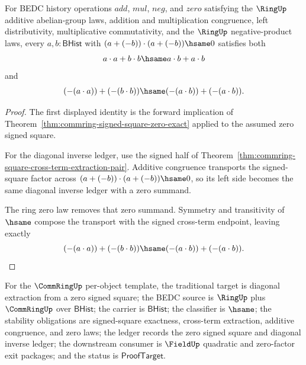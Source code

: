 \begin{theorem}
\label{thm:commring-signed-square-zero-diagonal-extraction-package}
For BEDC history operations $add$, $mul$, $neg$, and $zero$ satisfying the
$\RingUp$ additive abelian-group laws, addition and multiplication
congruence, left distributivity, multiplicative commutativity, and the
$\RingUp$ negative-product laws, every $a,b : \mathsf{BHist}$ with
$(a+(-b))\cdot(a+(-b))\hsame0$ satisfies both
$$
a\cdot a+b\cdot b\hsame a\cdot b+a\cdot b
$$
and
$$
(-(a\cdot a))+(-(b\cdot b))\hsame (-(a\cdot b))+(-(a\cdot b)).
$$
\end{theorem}
\begin{proof}
The first displayed identity is the forward implication of
Theorem~\ref{thm:commring-signed-square-zero-exact} applied to the assumed zero
signed square.

For the diagonal inverse ledger, use the signed half of
Theorem~\ref{thm:commring-square-cross-term-extraction-pair}. Additive
congruence transports the signed-square factor across
$(a+(-b))\cdot(a+(-b))\hsame0$, so its left side becomes the same diagonal
inverse ledger with a zero summand.

The ring zero law removes that zero summand. Symmetry and transitivity of
$\hsame$ compose the transport with the signed cross-term endpoint, leaving
exactly
$$
(-(a\cdot a))+(-(b\cdot b))\hsame (-(a\cdot b))+(-(a\cdot b)).
$$
\end{proof}

For the $\CommRingUp$ per-object template, the traditional target is diagonal
extraction from a zero signed square; the BEDC source is $\RingUp$ plus
$\CommRingUp$ over $\mathsf{BHist}$; the carrier is $\mathsf{BHist}$; the
classifier is $\hsame$; the stability obligations are signed-square exactness,
cross-term extraction, additive congruence, and zero laws; the ledger records the
zero signed square and diagonal inverse ledger; the downstream consumer is
$\FieldUp$ quadratic and zero-factor exit packages; and the status is
$\mathsf{ProofTarget}$.


